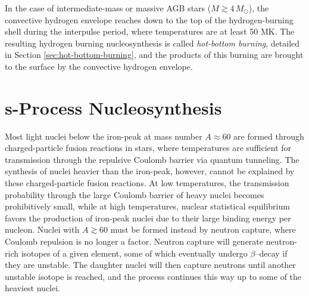 In the case of intermediate-mass or massive AGB stars ($M \gtrsim 4 \, M_{\odot}$), the convective hydrogen envelope reaches down to the top of the hydrogen-burning shell during the interpulse period, where temperatures are at least 50 MK. The resulting hydrogen burning nucleosynthesis is called \emph{hot-bottom burning}, detailed in Section \ref{sec:hot-bottom-burning}, and the products of this burning are brought to the surface by the convective hydrogen envelope.

\section{s-Process Nucleosynthesis} \label{sec:s-process}



Most light nuclei below the iron-peak at mass number $A \approx 60$ are formed through charged-particle fusion reactions in stars, where temperatures are sufficient for transmission through the repulsive Coulomb barrier via quantum tunneling. The synthesis of nuclei heavier than the iron-peak, however, cannot be explained by these charged-particle fusion reactions. At low temperatures, the transmission probability through the large Coulomb barrier of heavy nuclei becomes prohibitively small, while at high temperatures, nuclear statistical equilibrium favors the production of iron-peak nuclei due to their large binding energy per nucleon. Nuclei with $A \gtrsim 60$ must be formed instead by neutron capture, where Coulomb repulsion is no longer a factor. Neutron capture will generate neutron-rich isotopes of a given element, some of which eventually undergo $\beta$--decay if they are unstable. The daughter nuclei will then capture neutrons until another unstable isotope is reached, and the process continues this way up to some of the heaviest nuclei.

